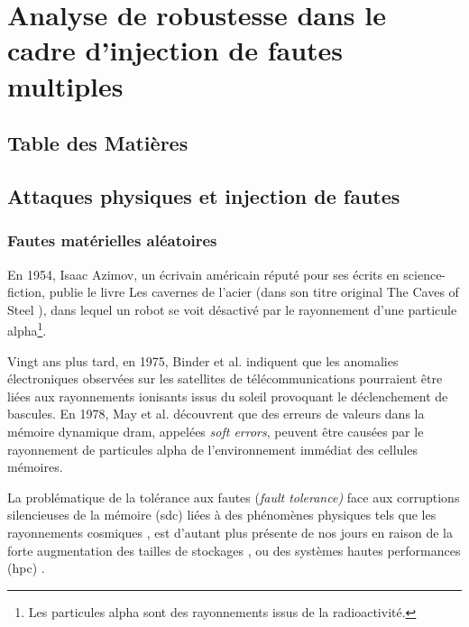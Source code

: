 \chapter{Analyse de robustesse dans le cadre d'injection de fautes multiples}
\label{chpt:background}

    \setcounter{tocdepth}{2}
    \section*{Table des Matières}
    \localtableofcontents
    
    \section{Attaques physiques et injection de fautes}
    \label{sec:physical-attacks}
    
        \subsection{Fautes matérielles aléatoires}
        
            En 1954, Isaac Azimov, un écrivain américain réputé pour ses écrits en science-fiction, publie le livre \og Les cavernes de l'acier \fg{} (dans son titre original \og The Caves of Steel \fg{} \cite{Asimov/Cave}), dans lequel un robot se voit désactivé par le rayonnement d'une particule alpha\footnote{Les particules alpha sont des rayonnements issus de la radioactivité.}. 
            
            Vingt ans plus tard, en 1975, Binder et al. \cite{binder1975satellite} indiquent que les anomalies électroniques observées sur les satellites de télécommunications pourraient être liées aux rayonnements ionisants issus du soleil provoquant le déclenchement de bascules. En 1978, May et al. \cite{May/78} découvrent que des erreurs de valeurs dans la mémoire dynamique \gls{dram}, appelées \textit{soft errors}, peuvent être causées par le rayonnement de particules alpha de l'environnement immédiat des cellules mémoires. 
            
            La problématique de la tolérance aux fautes (\textit{fault tolerance)} face aux corruptions silencieuses de la mémoire (\gls{sdc}) liées à des phénomènes physiques tels que les rayonnements cosmiques \cite{Ziegler/79}, est d'autant plus présente de nos jours en raison de la forte augmentation des tailles de stockages \cite{Charyyev/19}, ou des systèmes hautes performances (\gls{hpc}) \cite{di2016adaptive}. 
            
